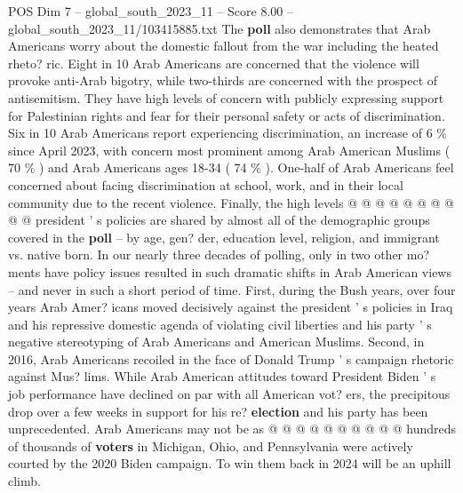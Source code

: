 \begin{textsample}{POS Dim 7 – global\_south\_2023\_11 – Score 8.00 – global\_south\_2023\_11/103415885.txt}
The \textbf{poll} also demonstrates that Arab Americans worry about the domestic fallout from the war including the heated rheto? ric.
Eight in 10 Arab Americans are concerned that the violence will provoke anti-Arab bigotry, while two-thirds are concerned with the prospect of antisemitism.
They have high levels of concern with publicly expressing support for Palestinian rights and fear for their personal safety or acts of discrimination.
Six in 10 Arab Americans report experiencing discrimination, an increase of 6 \% since April 2023, with concern most prominent among Arab American Muslims ( 70 \% ) and Arab Americans ages 18-34 ( 74 \% ).
One-half of Arab Americans feel concerned about facing discrimination at school, work, and in their local community due to the recent violence.
Finally, the high levels @ @ @ @ @ @ @ @ @ @ president ' s policies are shared by almost all of the demographic groups covered in the \textbf{poll} -- by age, gen? der, education level, religion, and immigrant vs. native born.
In our nearly three decades of polling, only in two other mo? ments have policy issues resulted in such dramatic shifts in Arab American views -- and never in such a short period of time.
First, during the Bush years, over four years Arab Amer? icans moved decisively against the president ' s policies in Iraq and his repressive domestic agenda of violating civil liberties and his party ' s negative stereotyping of Arab Americans and American Muslims.
Second, in 2016, Arab Americans recoiled in the face of Donald Trump ' s campaign rhetoric against Mus? lims.
While Arab American attitudes toward President Biden ' s job performance have declined on par with all American vot? ers, the precipitous drop over a few weeks in support for his re? \textbf{election} and his party has been unprecedented.
Arab Americans may not be as @ @ @ @ @ @ @ @ @ @ hundreds of thousands of \textbf{voters} in Michigan, Ohio, and Pennsylvania were actively courted by the 2020 Biden campaign.
To win them back in 2024 will be an uphill climb.

\end{textsample}
